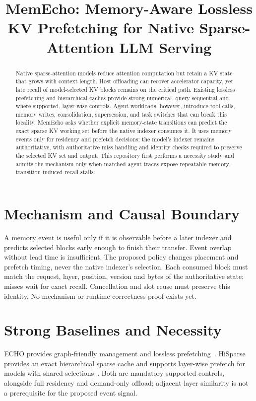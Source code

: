 \documentclass[sigconf,review,anonymous]{acmart}
\title{MemEcho: Memory-Aware Lossless KV Prefetching for Native Sparse-Attention LLM Serving}
\begin{document}
\begin{abstract}
Native sparse-attention models reduce attention computation but retain a KV
state that grows with context length. Host offloading can recover accelerator
capacity, yet late recall of model-selected KV blocks remains on the critical
path. Existing lossless prefetching and hierarchical caches provide strong
numerical, query-sequential and, where supported, layer-wise controls. Agent workloads, however, introduce tool calls,
memory writes, consolidation, supersession, and task switches that can break
this locality. MemEcho asks whether explicit memory-state transitions can
predict the exact sparse KV working set before the native indexer consumes it.
It uses memory events only for residency and prefetch decisions; the model's
indexer remains authoritative, with authoritative miss handling and identity checks required to preserve
the selected KV set and output. This repository first performs a necessity study and admits
the mechanism only when matched agent traces expose repeatable
memory-transition-induced recall stalls.
\end{abstract}
\maketitle
\section{Mechanism and Causal Boundary}
A memory event is useful only if it is observable before a later indexer and
predicts selected blocks early enough to finish their transfer. Event overlap
without lead time is insufficient. The proposed policy changes placement and
prefetch timing, never the native indexer's selection. Each consumed block
must match the request, layer, position, version and bytes of the authoritative
state; misses wait for exact recall. Cancellation and slot reuse must preserve
this identity. No mechanism or runtime correctness proof exists yet.

\section{Strong Baselines and Necessity}
ECHO provides graph-friendly management and lossless prefetching~\cite{echo}.
HiSparse provides an exact hierarchical sparse cache and supports layer-wise
prefetch for models with shared selections~\cite{hisparse}. Both are mandatory
supported controls, alongside full residency and demand-only offload; adjacent
layer similarity is not a prerequisite for the proposed event signal.
\end{document}

